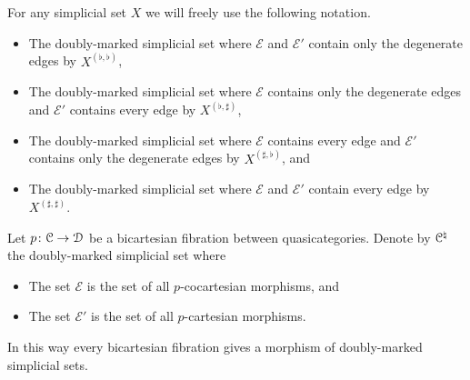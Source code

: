 \documentclass[main.tex]{subfiles}
\begin{document}
\begin{example}
  For any simplicial set $X$ we will freely use the following notation.
  \begin{itemize}
    \item The doubly-marked simplicial set where $\mathcal{E}$ and $\mathcal{E}'$ contain only the degenerate edges by $X^{( \flat, \flat )}$,

    \item The doubly-marked simplicial set where $\mathcal{E}$ contains only the degenerate edges and $\mathcal{E}'$ contains every edge by $X^{( \flat, \sharp )}$,

    \item The doubly-marked simplicial set where $\mathcal{E}$ contains every edge and $\mathcal{E}'$ contains only the degenerate edges by $X^{( \sharp, \flat )}$, and

    \item The doubly-marked simplicial set where $\mathcal{E}$ and $\mathcal{E}'$ contain every edge by $X^{( \sharp, \sharp )}$.
  \end{itemize}
\end{example}

\begin{example}
  \label{eg:bicartesian_marking}
  Let $p\colon \mathcal{C} \to \mathcal{D}$ be a bicartesian fibration between quasicategories. Denote by $\mathcal{C}^{\natural}$ the doubly-marked simplicial set where
  \begin{itemize}
    \item The set $\mathcal{E}$ is the set of all $p$-cocartesian morphisms, and

    \item The set $\mathcal{E}'$ is the set of all $p$-cartesian morphisms.
  \end{itemize}

  In this way every bicartesian fibration gives a morphism of doubly-marked simplicial sets.
\end{example}

%
\end{document}

